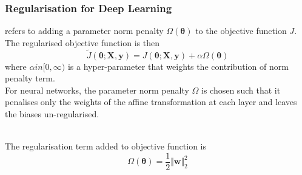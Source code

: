 \subsubsection{Regularisation for Deep Learning}

\begin{definition}  refers to adding a parameter norm penalty $\Omega(\bm{\theta})$ to the objective function $J$. The regularised objective function is then
\begin{equation*}
\tilde{J}(\bm{\theta}; \bm{X}, \bm{y}) = J(\bm{\theta}; \bm{X}, \bm{y}) + \alpha \Omega(\bm{\theta}) \nonumber
\end{equation*}
where $\alpha in [0, \infty)$ is a hyper-parameter that weights the contribution of norm penalty term.\\
For neural networks, the parameter norm penalty $\Omega$ is chosen such that it penalises only the weights of the affine transformation at each layer and leaves the biases un-regularised.
\end{definition}

\begin{definition} \\
The regularisation term added to objective function is
\begin{equation*}
\Omega(\bm{\theta}) = \frac{1}{2} \Vert \bm{w} \Vert^2_2 \nonumber
\end{equation*}
\end{definition}

